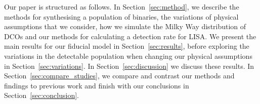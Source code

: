 Our paper is structured as follows. In Section~\ref{sec:method}, we describe the methods for synthesising a population of binaries, the variations of physical assumptions that we consider, how we simulate the Milky Way distribution of DCOs and our methods for calculating a detection rate for LISA. We present the main results for our fiducial model in Section~\ref{sec:results}, before exploring the variations in the detectable population when changing our physical assumptions in Section~\ref{sec:variations}. In Section~\ref{sec:discussion} we discuss these results. In Section~\ref{sec:compare_studies}, we compare and contrast our methods and findings to previous work and finish with our conclusions in Section~\ref{sec:conclusion}.